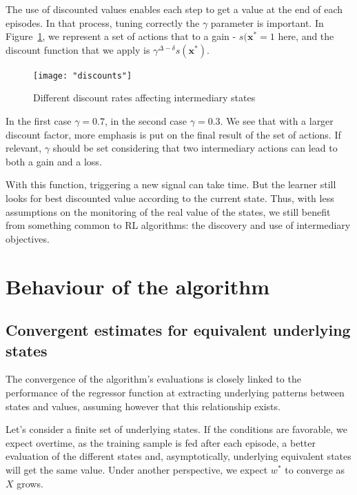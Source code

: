 \documentclass[letterpaper, 10.5 pt, conference]{ieeeconf}
\newcommand{\B}[1]{\mathbf{#1}}
\begin{document}
The use of discounted values enables each step to get a value at the end of each episodes. In that process, tuning correctly the $\gamma$ parameter is important. In Figure~\ref{fig:discounts}, we represent a set of actions that to a gain - $s(\B{x^*} = 1$ here, and the discount function that we apply is $\gamma^{\Delta-\delta}s(\B{x^*})$.

\begin{figure}
\begin{center}
\texttt{[image: "discounts"]}
\caption{Different discount rates affecting intermediary states}
\label{fig:discounts}
\end{center}
\end{figure}

In the first case $\gamma=0.7$, in the second case $\gamma=0.3$. We see that with a larger discount factor, more emphasis is put on the final result of the set of actions. If relevant, $\gamma$ should be set considering that two intermediary actions can lead to both a gain and a loss.

With this function, triggering a new signal can take time. But the learner still looks for best discounted value according to the current state. Thus, with less assumptions on the monitoring of the real value of the states, we still benefit from something common to RL algorithms: the discovery and use of intermediary objectives.

\section{Behaviour of the algorithm}

\subsection{Convergent estimates for equivalent underlying states}

The convergence of the algorithm's evaluations is closely linked to the performance of the regressor function at extracting underlying patterns between states and values, assuming however that this relationship exists.

Let's consider a finite set of underlying states. If the conditions are favorable, we expect overtime, as the training sample is fed after each episode, a better evaluation of the different states and, asymptotically, underlying equivalent states will get the same value. Under another perspective, we expect $w^*$ to converge as $X$ grows. 
\end{document}
